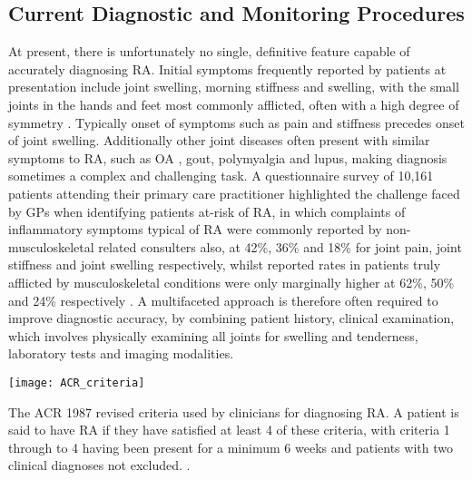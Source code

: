 \documentclass[twoside]{bhamthesis}
\theoremstyle{definition}
\begin{document}

\subsection{Current Diagnostic and Monitoring Procedures}

\label{Current Diagnostic and Monitoring Procedures}

At present, there is unfortunately no single, definitive feature capable of accurately diagnosing RA. Initial symptoms frequently reported by patients at presentation include joint swelling, morning stiffness and swelling, with the small joints in the hands and feet most commonly afflicted, often with a high degree of symmetry \cite{arnett1988american}. Typically onset of symptoms such as pain and stiffness precedes onset of joint swelling. Additionally other joint diseases often present with similar symptoms to RA, such as OA \cite{santos2012osteoarthritis}, gout, polymyalgia and lupus, making diagnosis sometimes a complex and challenging task. A questionnaire survey of 10,161 patients attending their primary care practitioner highlighted the challenge faced by GPs when identifying patients at-risk of RA, in which complaints of inflammatory symptoms typical of RA were commonly reported by non-musculoskeletal related consulters also, at 42\%, 36\% and 18\% for joint pain, joint stiffness and joint swelling respectively, whilst reported rates in patients truly afflicted by musculoskeletal conditions were only marginally higher at 62\%, 50\% and 24\% respectively \cite{hider2019symptoms}. A multifaceted approach is therefore often required to improve diagnostic accuracy, by combining patient history, clinical examination, which involves physically examining all joints for swelling and tenderness, laboratory tests and imaging modalities. 

\begin{table}[!ht]
\centering
  \texttt{[image: ACR\_criteria]}
\caption[The ACR 1987 revised criteria used by clinicians for diagnosing RA. A patient is said to have RA if they have satisfied at least 4 of these criteria, with criteria 1 through to 4 having been present for a minimum 6 weeks and patients with two clinical diagnoses not excluded.]{The ACR 1987 revised criteria used by clinicians for diagnosing RA. A patient is said to have RA if they have satisfied at least 4 of these criteria, with criteria 1 through to 4 having been present for a minimum 6 weeks and patients with two clinical diagnoses not excluded. \cite{arnett1988american}.}
\label{fig:ACR_criteria}
\end{table}
\end{document}
